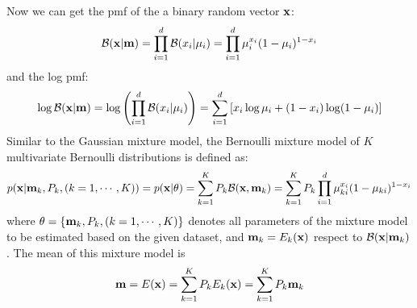 \documentclass{article}
\begin{document}
Now we can get the pmf of the a binary random vector ${\bf x}$:
\begin{equation}
  {\cal B}({\bf x}|{\bf m})=\prod_{i=1}^d {\cal B}(x_i|\mu_i)
  =\prod_{i=1}^d \mu_i^{x_i}(1-\mu_i)^{1-x_i}
\end{equation}
and the log pmf:
\begin{equation}
  \log {\cal B}({\bf x}|{\bf m})
  =\log\left(\prod_{i=1}^d {\cal B}(x_i|\mu_i)\right)
  =\sum_{i=1}^d \left[ x_i\log\mu_i+(1-x_i)\log(1-\mu_i) \right]
\end{equation}
Similar to the Gaussian mixture model, the Bernoulli mixture model 
of $K$ multivariate Bernoulli distributions is defined as:
\begin{equation}
  p({\bf x}|{\bf m}_k,P_k,(k=1,\cdots,K))=p({\bf x}|{\bf\theta})
  =\sum_{k=1}^K P_k {\cal B}({\bf x},{\bf m}_k)
  =\sum_{k=1}^K P_k \prod_{i=1}^d \mu_{ki}^{x_i}(1-\mu_{ki})^{1-x_i}
\end{equation}
where ${\bf\theta}=\{{\bf m}_k,P_k,(k=1,\cdots,K)\}$ denotes 
all parameters of the mixture model to be estimated based on 
the given dataset, and ${\bf m}_k=E_k({\bf x})$ respect to 
${\cal B}({\bf x}|{\bf m}_k)$. The mean of this mixture model is
\begin{equation}
  {\bf m}=E({\bf x})=\sum_{k=1}^KP_k E_k({\bf x})=\sum_{k=1}^K P_k{\bf m}_k
\end{equation}
\begin{comment}
The covariance of the mixture model is
\begin{eqnarray}
  {\bf\Sigma}&=&Cov({\bf x})
  =E({\bf x}{\bf x}^T)-E({\bf x})\,E({\bf x})^T
  =\sum_{k=1}^KP_k E_k({\bf x}{\bf x}^T)-E({\bf x})\,E({\bf x})^T
  \nonumber\\
  &=&\sum_{k=1}^K \left[{\bf\Sigma}_k+{\bf m}_k{\bf m}_k^T\right]-{\bf m}{\bf m}^T
\end{eqnarray}
\end{comment}
\end{document}
